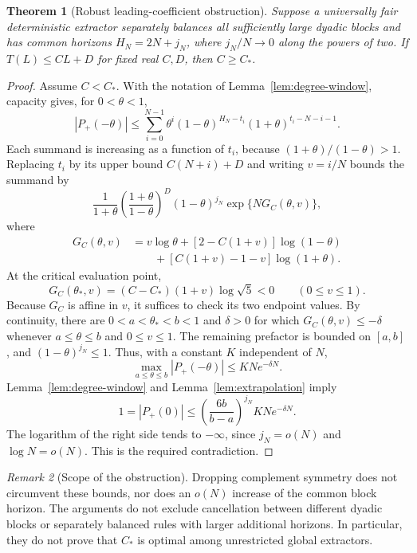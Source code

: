 \documentclass[11pt]{article}
\newtheorem{theorem}{Theorem}[section]
\theoremstyle{definition}
\theoremstyle{remark}
\newtheorem{remark}[theorem]{Remark}
\begin{document}
\begin{theorem}[Robust leading-coefficient obstruction]\label{thm:sublinear-horizon}
Suppose a universally fair deterministic extractor separately balances
all sufficiently large dyadic blocks and has common horizons
$H_N=2N+j_N$, where $j_N/N\to0$ along the powers of two. If
$T(L)\le CL+D$ for fixed real $C,D$, then $C\ge C_*$.
\end{theorem}
\begin{proof}
Assume $C<C_*$. With the notation of Lemma~\ref{lem:degree-window},
capacity gives, for $0<\theta<1$,
\begin{equation}\label{eq:extra-evaluation}
 |P_+(-\theta)|\le
 \sum_{i=0}^{N-1}\theta^i(1-\theta)^{H_N-t_i}
                     (1+\theta)^{t_i-N-i-1}.
\end{equation}
Each summand is increasing as a function of $t_i$, because
$(1+\theta)/(1-\theta)>1$. Replacing $t_i$ by its upper bound
$C(N+i)+D$ and writing $v=i/N$ bounds the summand by
\[
 \frac1{1+\theta}
 \left(\frac{1+\theta}{1-\theta}\right)^D
 (1-\theta)^{j_N}\exp\{N G_C(\theta,v)\},
\]
where
\begin{align*}
 G_C(\theta,v)
 &=v\log\theta+[2-C(1+v)]\log(1-\theta)\\
 &\hspace{2em}+[C(1+v)-1-v]\log(1+\theta).
\end{align*}
At the critical evaluation point,
\[
 G_C(\theta_*,v)=(C-C_*)(1+v)\log\sqrt5<0
 \qquad(0\le v\le1).
\]
Because $G_C$ is affine in $v$, it suffices to check its two endpoint
values. By continuity, there are $0<a<\theta_*<b<1$ and $\delta>0$
for which $G_C(\theta,v)\le-\delta$ whenever $a\le\theta\le b$ and
$0\le v\le1$. The remaining prefactor is bounded on $[a,b]$, and
$(1-\theta)^{j_N}\le1$. Thus, with a constant $K$ independent of $N$,
\[
 \max_{a\le\theta\le b}|P_+(-\theta)|\le KN e^{-\delta N}.
\]
Lemma~\ref{lem:degree-window} and Lemma~\ref{lem:extrapolation} imply
\[
 1=|P_+(0)|\le
 \left(\frac{6b}{b-a}\right)^{j_N}KN e^{-\delta N}.
\]
The logarithm of the right side tends to $-\infty$, since
$j_N=o(N)$ and $\log N=o(N)$. This is the required contradiction.
\end{proof}

\begin{remark}[Scope of the obstruction]
Dropping complement symmetry does not circumvent these bounds, nor does
an $o(N)$ increase of the common block horizon. The arguments do not
exclude cancellation between different dyadic blocks or separately
balanced rules with larger additional horizons. In particular, they do
not prove that $C_*$ is optimal among unrestricted global extractors.
\end{remark}
\end{document}

